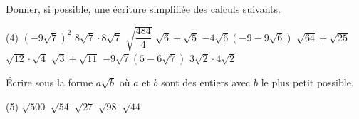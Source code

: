 \documentclass[a4paper,12pt]{report}
\begin{document}

\begin{auto}Donner, si possible, une écriture simplifiée des calculs suivants.

\begin{tasks}(4)
	\task $\left(-9 \sqrt{7}\right)^{2}$
	\task $8 \sqrt{7}\cdot 8\sqrt{7}$
	\task $ \sqrt{\dfrac{484}{4}}$
	\task $\sqrt{6}+\sqrt{5}$
	\task $ -4 \sqrt{6}\left( -9  -9\sqrt{6}\right)$
	\task $  \sqrt{64}+\sqrt{25}$
	\task $ \sqrt{12}\cdot \sqrt{4}$
	\task $\sqrt{3}+\sqrt{11}$
	\task $ -9 \sqrt{7}\left( 5  -6\sqrt{7}\right)$
	\task $3 \sqrt{2}\cdot 4\sqrt{2}$
\end{tasks}

\end{auto}

\begin{auto}
Écrire sous la forme $a\sqrt{b}$ où $a$ et $b$ sont des entiers avec $b$ le plus petit possible.

\begin{tasks}(5)
	\task  $\sqrt{500}$
	\task  $\sqrt{54}$
	\task  $\sqrt{27}$
	\task  $\sqrt{98}$
	\task  $\sqrt{44}$
\end{tasks}
\end{auto}
\end{document}
